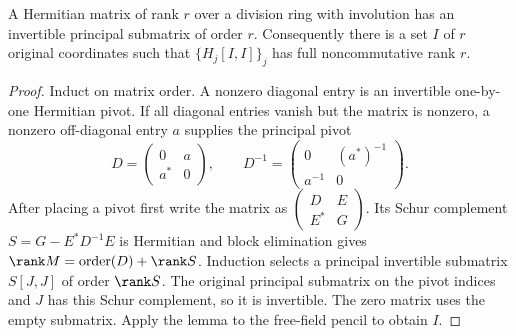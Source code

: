 \begin{lemma}\label{lem:principal}
A Hermitian matrix of rank $r$ over a division ring with involution has
an invertible principal submatrix of order $r$. Consequently there is
a set $I$ of $r$ original coordinates such that
$\{H_j[I,I]\}_j$ has full noncommutative rank $r$.
\end{lemma}
\begin{proof}
Induct on matrix order. A nonzero diagonal entry is an invertible
one-by-one Hermitian pivot. If all diagonal entries vanish but the matrix
is nonzero, a nonzero off-diagonal entry $a$ supplies the principal pivot
\[
 D=\begin{pmatrix}0&a\\a^*&0\end{pmatrix},\qquad
 D^{-1}=\begin{pmatrix}0&(a^*)^{-1}\\a^{-1}&0\end{pmatrix}.
\]
After placing a pivot first write the matrix as
$\left(\begin{smallmatrix}D&E\\E^*&G\end{smallmatrix}\right)$.
Its Schur complement $S=G-E^*D^{-1}E$ is Hermitian and block elimination
gives $\rank M=\operatorname{order}(D)+\rank S$. Induction selects a
principal invertible submatrix $S[J,J]$ of order $\rank S$.
The original principal submatrix on the pivot indices and $J$ has this
Schur complement, so it is invertible. The zero matrix uses the empty
submatrix. Apply the lemma to the free-field pencil to obtain $I$.
\end{proof}


